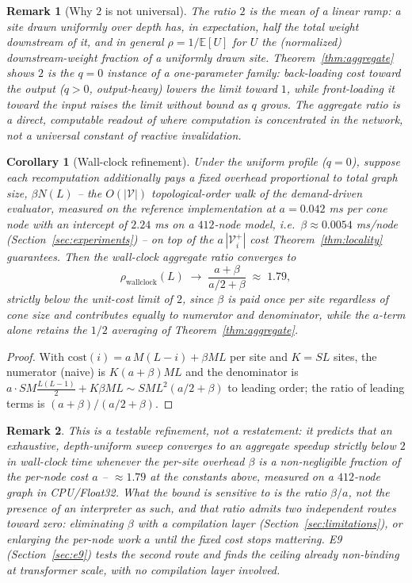 \documentclass[11pt,a4paper]{article}
\newtheorem{corollary}{Corollary}
\newtheorem{remark}{Remark}
\newcommand{\V}{\mathcal{V}}
\begin{document}
\begin{remark}[Why $2$ is not universal]
The ratio $2$ is the mean of a linear ramp: a site drawn uniformly over depth has, in expectation,
half the total weight downstream of it, and in general $\rho = 1/\mathbb{E}[U]$ for $U$ the
(normalized) downstream-weight fraction of a uniformly drawn site. Theorem~\ref{thm:aggregate}
shows $2$ is the $q=0$ instance of a one-parameter family: back-loading cost toward the output
($q>0$, output-heavy) \emph{lowers} the limit toward $1$, while front-loading it toward the input
\emph{raises} the limit without bound as $q$ grows. The aggregate ratio is a direct, computable
readout of \emph{where} computation is concentrated in the network, not a universal constant of
reactive invalidation.
\end{remark}

\begin{corollary}[Wall-clock refinement]
\label{cor:wallclock}
Under the uniform profile ($q=0$), suppose each recomputation additionally pays a fixed overhead
proportional to total graph size, $\beta N(L)$ -- the $O(|\V|)$ topological-order walk of the
demand-driven evaluator, measured on the reference implementation at $a = 0.042$ ms per cone node
with an intercept of $2.24$ ms on a $412$-node model, i.e.\ $\beta \approx 0.0054$ ms/node
(Section~\ref{sec:experiments}) -- on top of the $a\,|\V_i^+|$
cost Theorem~\ref{thm:locality} guarantees. Then the wall-clock aggregate ratio converges to
\[
\rho_{\mathrm{wallclock}}(L) \;\longrightarrow\; \frac{a+\beta}{a/2+\beta} \;\approx\; 1.79,
\]
strictly below the unit-cost limit of $2$, since $\beta$ is paid once per site regardless of cone
size and contributes equally to numerator and denominator, while the $a$-term alone retains the
$1/2$ averaging of Theorem~\ref{thm:aggregate}.
\end{corollary}

\begin{proof}
With $\mathrm{cost}(i) = a\,M(L-i) + \beta ML$ per site and $K=SL$ sites, the numerator (naive) is
$K(a+\beta)ML$ and the denominator is $a\cdot SM\frac{L(L-1)}{2} + K\beta ML \sim SML^2(a/2+\beta)$
to leading order; the ratio of leading terms is $(a+\beta)/(a/2+\beta)$.
\end{proof}

\begin{remark}
This is a testable refinement, not a restatement: it predicts that an exhaustive, depth-uniform
sweep converges to an aggregate speedup \emph{strictly below} $2$ in wall-clock time whenever the
per-site overhead $\beta$ is a non-negligible fraction of the per-node cost $a$ -- $\approx 1.79$
at the constants above, measured on a $412$-node graph in CPU\slash Float32. What the bound is
sensitive to is the \emph{ratio} $\beta/a$, not the presence of an interpreter as such, and that
ratio admits two independent routes toward zero: eliminating $\beta$ with a compilation layer
(Section~\ref{sec:limitations}), or enlarging the per-node work $a$ until the fixed cost stops
mattering. E9 (Section~\ref{sec:e9}) tests the second route and finds the ceiling already
non-binding at transformer scale, with no compilation layer involved.
\end{remark}
\end{document}
